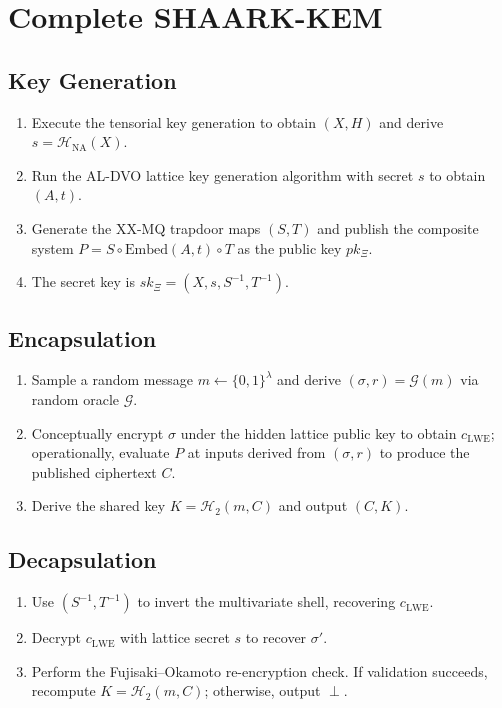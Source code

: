 \documentclass[11pt]{article}
\begin{document}
\section{Complete SHAARK-\Xi KEM}
\subsection{Key Generation}
\begin{enumerate}
    \item Execute the tensorial key generation to obtain $(X, H)$ and derive $s = \mathcal{H}_{\mathrm{NA}}(X)$.
    \item Run the AL-DVO lattice key generation algorithm with secret $s$ to obtain $(A, t)$.
    \item Generate the XX-MQ trapdoor maps $(S, T)$ and publish the composite system $P = S \circ \mathrm{Embed}(A, t) \circ T$ as the public key $pk_{\Xi}$.
    \item The secret key is $sk_{\Xi} = (X, s, S^{-1}, T^{-1})$.
\end{enumerate}

\subsection{Encapsulation}
\begin{enumerate}
    \item Sample a random message $m \leftarrow \{0,1\}^\lambda$ and derive $(\sigma, r) = \mathcal{G}(m)$ via random oracle $\mathcal{G}$.
    \item Conceptually encrypt $\sigma$ under the hidden lattice public key to obtain $c_{\mathrm{LWE}}$; operationally, evaluate $P$ at inputs derived from $(\sigma, r)$ to produce the published ciphertext $C$.
    \item Derive the shared key $K = \mathcal{H}_2(m, C)$ and output $(C, K)$.
\end{enumerate}

\subsection{Decapsulation}
\begin{enumerate}
    \item Use $(S^{-1}, T^{-1})$ to invert the multivariate shell, recovering $c_{\mathrm{LWE}}$.
    \item Decrypt $c_{\mathrm{LWE}}$ with lattice secret $s$ to recover $\sigma'$.
    \item Perform the Fujisaki--Okamoto re-encryption check. If validation succeeds, recompute $K = \mathcal{H}_2(m, C)$; otherwise, output $\perp$.
\end{enumerate}
\end{document}
